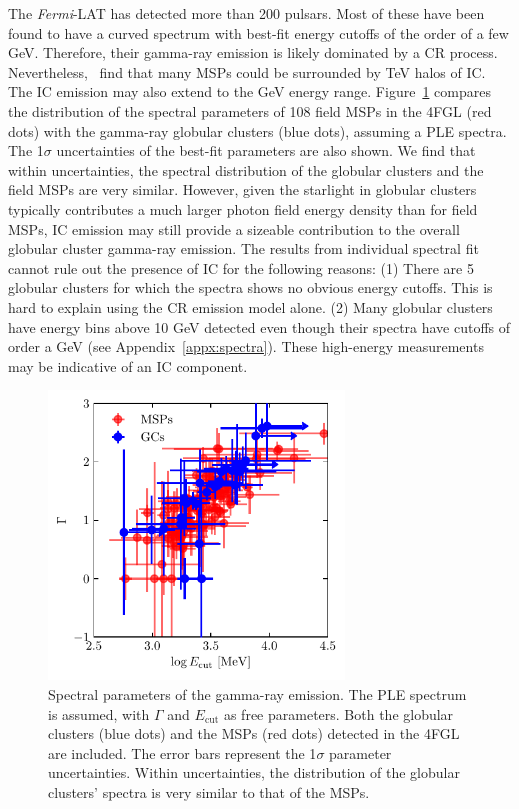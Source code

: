 \documentclass[doublespace,nopageskip]{VTthesis}
\begin{document}
The \textit{Fermi}-LAT has detected more than 200 pulsars. Most of these have been found to have a curved spectrum with best-fit energy cutoffs of the order of a few GeV. Therefore, their gamma-ray emission is likely dominated by a CR process. {Nevertheless,~\citet{2018PhRvD..98d3005H,2021arXiv210400014H} find} that many MSPs could be surrounded by TeV halos of IC. The IC emission may also extend to the GeV energy range. Figure~\ref{fig:msps} compares the distribution of the spectral parameters of 108 field MSPs in the 4FGL (red dots) with the gamma-ray globular clusters (blue dots), assuming a PLE spectra. The 1$\sigma$ uncertainties of the best-fit parameters are also shown. We find that within uncertainties, the spectral distribution of the globular clusters and the field MSPs are very similar. However, given the starlight in globular clusters typically contributes a much larger photon field energy density than for field MSPs, IC emission may still provide a sizeable contribution to the overall globular cluster gamma-ray emission. The results from individual spectral fit cannot rule out the presence of IC for the following reasons: (1) There are 5 globular clusters for which the spectra shows no obvious energy cutoffs. This is hard to explain using the CR emission model alone. (2) Many globular clusters have energy bins above 10 GeV detected even though their spectra have cutoffs of order a GeV (see Appendix~\ref{appx:spectra}). These high-energy measurements may be indicative of an IC component.

\begin{figure}[htb]
    \centering
    \includegraphics[width=0.7\textwidth]{Figures/Globular/msp_vs_gc.pdf}
    \caption{Spectral parameters of the gamma-ray emission. The PLE spectrum is assumed, with $\Gamma$ and $E_\mathrm{cut}$ as free parameters. Both the globular clusters (blue dots) and the MSPs (red dots) detected in the 4FGL are included. The error bars represent the 1$\sigma$ parameter uncertainties. Within uncertainties, the distribution of the globular clusters' spectra is very similar to that of the MSPs.}
    \label{fig:msps}
\end{figure}
\end{document}
